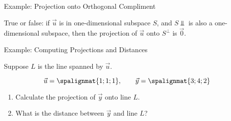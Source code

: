 \begin{frame}{Example: Projection onto Orthogonal Compliment}  

    True or false: if $\vec u$ is in one-dimensional subspace $S$, and $S\Perp$ is also a one-dimensional subspace, then the projection of $\vec u$ onto $S^{\perp}$ is $\vec{0}$.
\end{frame}







\begin{frame}{Example: Computing Projections and Distances}  

    Suppose $ L$ is the line spanned by $ \vec u$. 
    
    $$\vec u = \spalignmat{1;1;1}, \qquad \vec y = \spalignmat{3;4;2}  $$
    \begin{enumerate}
        \item Calculate the projection of $ \vec y$ onto line $ L$.  
        \item What is the distance between $ \vec y $ and line $L$? 
    \end{enumerate}
    \vspace{2in} 
\end{frame}








